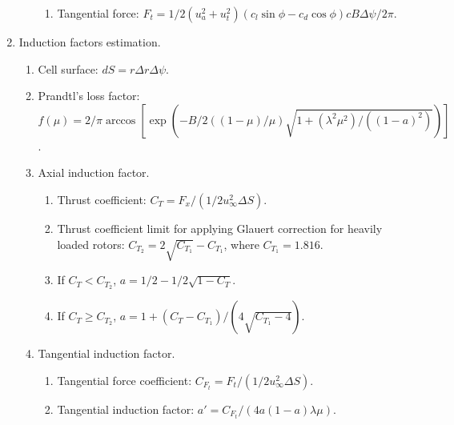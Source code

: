 \begin{enumerate}
\begin{enumerate}
\begin{enumerate}
			\item Tangential force: $ F_t = 1/2 (u_a^2+u_t^2) (c_l \sin \phi - c_d \cos \phi) c B \Delta \psi / 2 \pi $.
			
		\end{enumerate}
		
	\end{enumerate}

	\item Induction factors estimation.
	
	\begin{enumerate}
		
		\item Cell surface: $ dS = r \Delta r \Delta \psi $.
		
		\item Prandtl's loss factor: $ f(\mu) = 2/\pi \arccos \left[ \exp \left( - B/2 \left( (1-\mu)/\mu \right) \sqrt{1+(\lambda^2\mu^2)/((1-a)^2)} \right) \right] $.
		
		\item Axial induction factor.
		
		\begin{enumerate}
			
			\item Thrust coefficient: $ C_T = F_x/(1/2 u_{\infty}^2 \Delta S) $.
			
			\item Thrust coefficient limit for applying Glauert correction for heavily loaded rotors: $ C_{T_2} = 2 \sqrt{C_{T_1}} - C_{T_1} $, where $ C_{T_1} = 1.816 $.
			
			\item If $ C_T < C_{T_2} $, $ a = 1/2 - 1/2 \sqrt{1-C_T} $.
			
			\item If $ C_T \geq C_{T_2} $, $ a = 1 + (C_T-C_{T_1})/(4 \sqrt{C_{T_1}-4}) $.
			
		\end{enumerate}
	
		\item Tangential induction factor.
		
		\begin{enumerate}
			
			\item Tangential force coefficient: $ C_{F_t} = F_t/(1/2 u_{\infty}^2 \Delta S) $.
			
			\item Tangential induction factor: $ a' = C_{F_t} / (4a (1-a) \lambda \mu) $.
			
		\end{enumerate}
	

\end{enumerate}
\end{enumerate}
